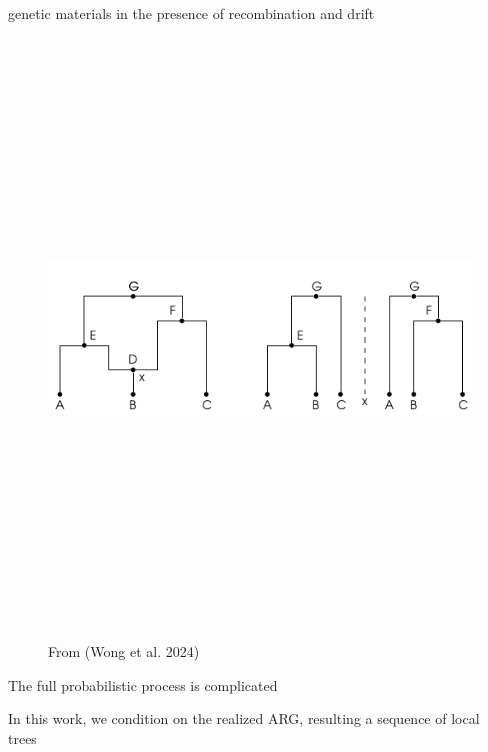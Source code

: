 \documentclass[
  letterpaper,
  DIV=11,
  numbers=noendperiod]{scrartcl}
\begin{document}
genetic materials in the presence of recombination and drift

\begin{figure}[H]

{\centering \includegraphics[width=\linewidth,height=6.25in,keepaspectratio]{slides_files/mediabag/imgs/full_arg-1.pdf}

}

\caption{From (Wong et al. 2024)}

\end{figure}%

The full probabilistic process is complicated

In this work, we condition on the realized ARG, resulting a sequence of
local trees
\end{document}
